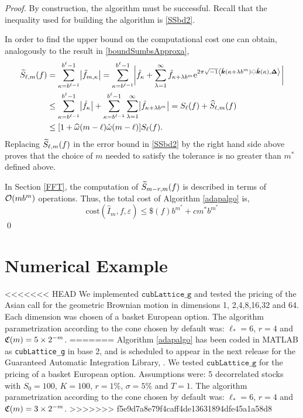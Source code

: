 \documentclass[graybox]{svmult}
\newcommand{\bsDelta}{\boldsymbol{\Delta}}    %
\begin{document}
\begin{proof}
By construction, the algorithm must be successful. Recall that the inequality used for building the algorithm is \eqref{SSbd2}.

In order to find the upper bound on the computational cost one can obtain, analogously to the result in \eqref{boundSumbsApproxa},
\begin{align}
\nonumber
\tS_{\ell,m}(f) &= \sum_{\kappa=b^{\ell-1}}^{b^{\ell}-1} \bigabs{ \tf_{m,\kappa}} = \sum_{\kappa=b^{\ell-1}}^{b^{\ell}-1} \biggabs{\hf_{\kappa} + \sum_{\lambda=1}^{\infty} \hf_{\kappa+\lambda b^{m}} \E^{2 \pi \sqrt{-1} \ip{\tvk(\kappa+\lambda b^{m}) \ominus \tvk(\kappa)}{\bsDelta}}}\\
\nonumber
&\le \sum_{\kappa=b^{\ell-1}}^{b^{\ell}-1} \bigabs{\hf_{\kappa}} + \sum_{\kappa=b^{\ell-1}}^{b^{\ell}-1} \sum_{\lambda=1}^{\infty} \bigabs{\hf_{\kappa+\lambda b^{m}}} 
= S_{\ell}(f) + \hS_{\ell,m}(f) \\
\nonumber
&\le [1  + \homega(m-\ell) \wcomega(m-\ell)] S_\ell(f). \label{SSbd3}
\end{align}
Replacing $\widetilde{S}_{\ell,m}(f)$ in the error bound in \eqref{SSbd2} by the right hand side above proves that the choice of $m$ needed to satisfy the tolerance is no greater than  $m^*$ defined above.

In Section \ref{FFT}, the computation of $\widetilde{S}_{m-r,m}(f)$ is described in terms of $\mathcal{O}(mb^m)$ operations. Thus, the total cost of Algorithm \ref{adapalgo} is,
\[
\mathrm{cost}\left(\widehat{I}_m,f,\varepsilon\right)\leq \$(f)b^{m^*}+cm^*b^{m^*}
\]
\hfill \qed
\end{proof}

\section{Numerical Example} \label{secnumexpsec}

<<<<<<< HEAD
We implemented $\texttt{cubLattice\_g}$ and tested the pricing of the Asian call for the geometric Brownian motion in dimensions 1, 2,4,8,16,32 and 64. Each dimension was chosen 
 of a basket European option. The algorithm parametrization according to the cone chosen by default was: $\ell_*=6$, $r=4$ and $\mathfrak{C}(m)=5 \times 2^{-m}$.
=======
Algorithm \ref{adapalgo} has been coded in MATLAB as \texttt{cubLattice\_g} in base 2, and is scheduled to appear in the next release for the Guaranteed Automatic Integration Library, \cite{ChoEtal14a}. We tested $\texttt{cubLattice\_g}$ for the pricing of a basket European option. Assumptions were: 5 decorrelated stocks with $S_0=100$, $K=100$, $r=1\%$, $\sigma=5\%$ and $T=1$. The algorithm parametrization according to the cone chosen by default was: $\ell_*=6$, $r=4$ and $\mathfrak{C}(m)=3 \times 2^{-m}$.
>>>>>>> f5e9d7a8e79f4caff4de13631894dfe45a1a58d8
\end{document}
